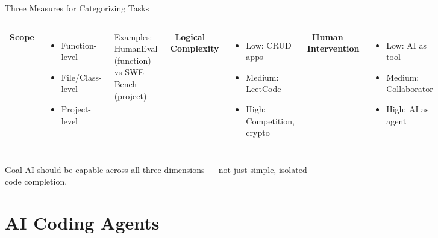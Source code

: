\documentclass[aspectratio=169,10pt]{beamer}
\begin{document}
\begin{frame}{Three Measures for Categorizing Tasks}
    \begin{columns}[T]
    \textbf{\faRuler~Scope}
    \begin{itemize}
        \item Function-level
        \item File/Class-level
        \item Project-level
    \end{itemize}
    {\small Examples: HumanEval (function) vs SWE-Bench (project)}
    
    \textbf{\faBrain~Logical Complexity}
    \begin{itemize}
        \item Low: CRUD apps
        \item Medium: LeetCode
        \item High: Competition, crypto
    \end{itemize}
    
    \textbf{\faUsers~Human Intervention}
    \begin{itemize}
        \item Low: AI as tool
        \item Medium: Collaborator
        \item High: AI as agent
    \end{itemize}
    \end{columns}
    
    \vspace{1em}
    \begin{exampleblock}{Goal}
    AI should be capable across all three dimensions — not just simple, isolated code completion.
    \end{exampleblock}
\end{frame}

\section{AI Coding Agents}
\end{document}
